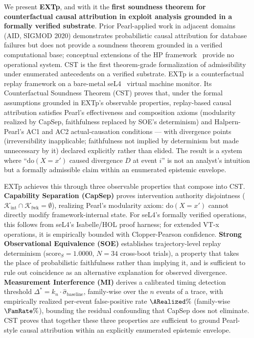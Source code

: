 \documentclass[conference]{IEEEtran}
\newcommand{\Kint}{\mathcal{K}_\text{int}}
\newcommand{\Kfwk}{\mathcal{K}_\text{fwk}}
\newcommand{\sigbase}{\hat{\sigma}_\text{baseline}}
\newcommand{\Dstar}{\Delta^{*}}
\newcommand{\scoreS}{\text{score}_S}
\newcommand{\dox}[1]{\text{do}(X{=}#1)}
\begin{document}
We present \textbf{EXTp}, and with it the \textbf{first soundness
theorem for counterfactual causal attribution in exploit analysis
grounded in a formally verified substrate}. Prior Pearl-applied
work in adjacent domains~\cite{fariha2020aid} (AID, SIGMOD 2020)
demonstrates probabilistic causal attribution for database failures
but does not provide a soundness theorem grounded in a verified
computational base; conceptual extensions of the HP
framework~\cite{soloviev2021nested} provide no operational system.
CST is the first theorem-grade formalization of admissibility
under enumerated antecedents on a verified substrate. EXTp is a
counterfactual replay framework on a bare-metal
seL4~\cite{klein2009sel4} virtual machine monitor. Its Counterfactual
Soundness Theorem (CST) proves that, under the formal assumptions
grounded in EXTp's observable properties, replay-based causal
attribution satisfies Pearl's effectiveness and composition axioms
(modularity realized by CapSep, faithfulness replaced by SOE's
determinism) and Halpern-Pearl's AC1 and AC2 actual-causation
conditions --- with divergence points (irreversibility inapplicable;
faithfulness not implied by determinism but made unnecessary by it)
declared explicitly rather than elided.
The result is a system where ``$\dox{x'}$ caused divergence $D$ at
event $i$'' is not an analyst's intuition but a formally admissible
claim within an enumerated epistemic envelope.

EXTp achieves this through three observable properties that compose
into CST. \textbf{Capability Separation (CapSep)} proves intervention
authority disjointness ($\Kint \cap \Kfwk = \emptyset$), realizing
Pearl's modularity axiom: $\dox{x'}$ cannot directly modify
framework-internal state. For seL4's formally verified operations,
this follows from seL4's Isabelle/HOL proof harness; for extended
VT-x operations, it is empirically bounded with Clopper-Pearson
confidence. \textbf{Strong Observational Equivalence (SOE)}
establishes trajectory-level replay determinism
($\scoreS = 1.0000$, $N{=}34$ cross-boot trials), a property that
takes the place of probabilistic faithfulness rather than implying
it, and is sufficient to rule out coincidence as an alternative
explanation for observed divergence. \textbf{Measurement Interference (MI)} derives a
calibrated timing detection threshold $\Dstar = k_n \cdot
\sigbase$, family-wise over the $n$ events of a trace, with
empirically realized per-event false-positive rate $\ARealized\%$
(family-wise $\FamRate\%$), bounding the residual confounding that CapSep
does not eliminate. CST proves that together these three properties
are sufficient to ground Pearl-style causal attribution within an
explicitly enumerated epistemic envelope.
\end{document}
